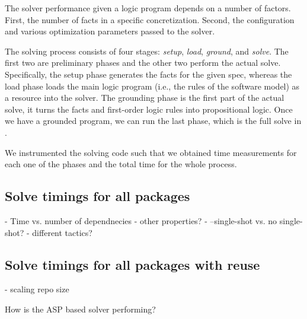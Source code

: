 The \clingo{} solver performance given a logic program depends
on a number of factors. First, the number of facts in a specific concretization. Second,
the configuration and various optimization parameters passed to the solver. 

The solving process consists of four stages: \emph{setup}, \emph{load}, 
\emph{ground}, and \emph{solve}. The first two are preliminary phases and the other two 
perform the actual solve. Specifically, the setup phase generates the facts for the given
spec, whereas the load phase loads the main logic program (i.e., the rules of the software 
model) as a resource into the solver. The grounding phase is the first part of the actual
solve, it turns the facts and first-order logic rules into propositional logic. Once we
have a grounded program, we can run the last phase, which is the full solve in \clingo{}.

We instrumented the solving code such that we obtained time measurements for each one
of the phases and the total time for the whole process.


\subsection{Solve timings for all packages}













- Time vs. number of dependnecies
- other properties?
- --single-shot vs. no single-shot?
- different tactics?

\subsection{Solve timings for all packages with reuse}
- scaling repo size


How is the ASP based solver performing?
